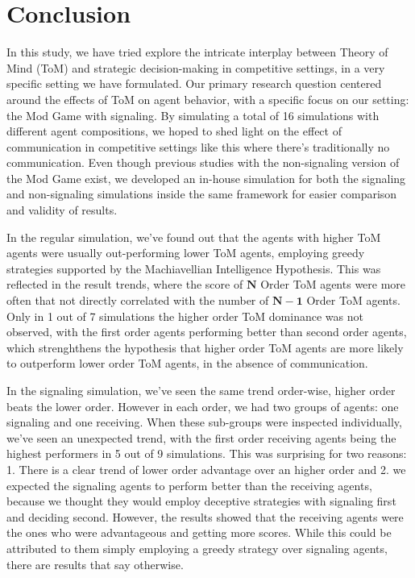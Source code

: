 \section{Conclusion}\label{sec:conclusion}

In this study, we have tried explore the intricate interplay between Theory of Mind (ToM) and strategic decision-making in competitive settings, in a very specific setting we have formulated. Our primary research question centered around the effects of ToM on agent behavior, with a specific focus on our setting:  the Mod Game with signaling. By simulating a total of 16 simulations with different agent compositions, we hoped to shed light on the effect of communication in competitive settings like this where there's traditionally no communication. Even though previous studies with the non-signaling version of the Mod Game exist, we developed an in-house simulation for both the signaling and non-signaling simulations inside the same framework for easier comparison and validity of results.

In the regular simulation, we've found out that the agents with higher ToM agents were usually out-performing lower ToM agents, employing greedy strategies supported by the Machiavellian Intelligence Hypothesis. This was reflected in the result trends, where the score of $\mathbf{N}$ Order ToM agents were more often that not directly correlated with the number of $\mathbf{N-1}$ Order ToM agents. Only in 1 out of 7 simulations the higher order ToM dominance was not observed, with the first order agents performing better than second order agents, which strenghthens the hypothesis that higher order ToM agents are more likely to outperform lower order ToM agents, in the absence of communication.

In the signaling simulation, we've seen the same trend order-wise, higher order beats the lower order. However in each order, we had two groups of agents: one signaling and one receiving. When these sub-groups were inspected individually, we've seen an unexpected trend, with the first order receiving agents being the highest performers in 5 out of 9 simulations. This was surprising for two reasons: 1. There is a clear trend of lower order advantage over an higher order and 2. we expected the signaling agents to perform better than the receiving agents, because we thought they would employ deceptive strategies with signaling first and deciding second. However, the results showed that the receiving agents were the ones who were advantageous and getting more scores. While this could be attributed to them simply employing a greedy strategy over signaling agents, there are results that say otherwise. 

